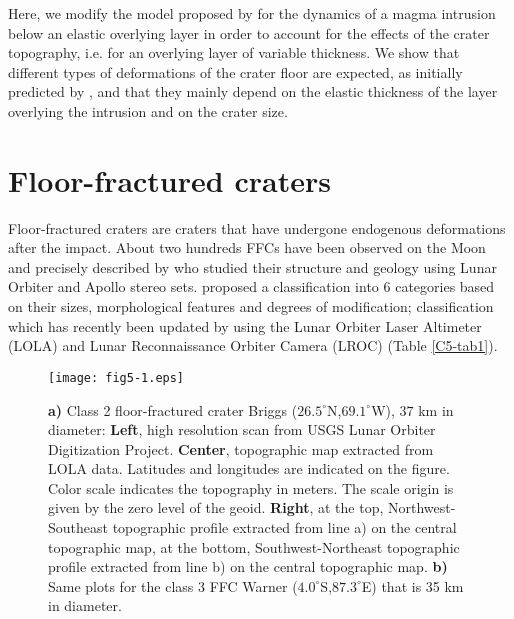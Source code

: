   Here, we modify the model proposed by \citet{Michaut:2011kg} for the
  dynamics of  a magma intrusion  below an elastic overlying  layer in
  order to account for the effects  of the crater topography, i.e. for
  an overlying  layer of variable  thickness.  We show  that different
  types of deformations of the crater floor are expected, as initially
  predicted by \citet{Schultz:1976kt}, and  that they mainly depend on
  the elastic  thickness of the  layer overlying the intrusion  and on
  the crater size.

  \section{Floor-fractured craters}
  \label{C5-FFC}

  Floor-fractured craters  are craters that have  undergone endogenous
  deformations after  the impact.  About  two hundreds FFCs  have been
  observed    on    the    Moon    and    precisely    described    by
  \citet{Schultz:1976kt} who studied their structure and geology using
  Lunar  Orbiter  and   Apollo  stereo  sets.   \citet{Schultz:1976kt}
  proposed a  classification into 6  categories based on  their sizes,
  morphological features  and degrees of  modification; classification
  which has recently been  updated by \citet{Jozwiak:2012dq} using the
  Lunar  Orbiter  Laser  Altimeter  (LOLA)  and  Lunar  Reconnaissance
  Orbiter Camera (LROC) (Table \ref{C5-tab1}).

\begin{figure}[h!]
  \graphicspath{ {/Users/thorey/Documents/These/Submission/Article/FFC_JGR_2013/Paper_APRES_2nd_REVIEW/} }
  \begin{center}
    \texttt{[image: fig5-1.eps]}
    \caption{\textbf{a)}   Class  2   floor-fractured  crater   Briggs
      ($26.5^{\circ}$N,$69.1^{\circ}$W),   $37$    km   in   diameter:
      \textbf{Left},  high resolution  scan  from  USGS Lunar  Orbiter
      Digitization Project. \textbf{Center}, topographic map extracted
      from LOLA  data. Latitudes and  longitudes are indicated  on the
      figure.  Color  scale indicates  the topography in  meters.  The
      scale  origin  is  given  by   the  zero  level  of  the  geoid.
      \textbf{Right},  at  the  top,  Northwest-Southeast  topographic
      profile extracted from  line a) on the  central topographic map,
      at the bottom, Southwest-Northeast topographic profile extracted
      from line b)  on the central topographic  map.  \textbf{b)} Same
      plots      for       the      class      3       FFC      Warner
      ($4.0^{\circ}$S,$87.3^{\circ}$E) that is 35 km in diameter.}
    \label{C5-fig5-1}
  \end{center}
\end{figure}
	
